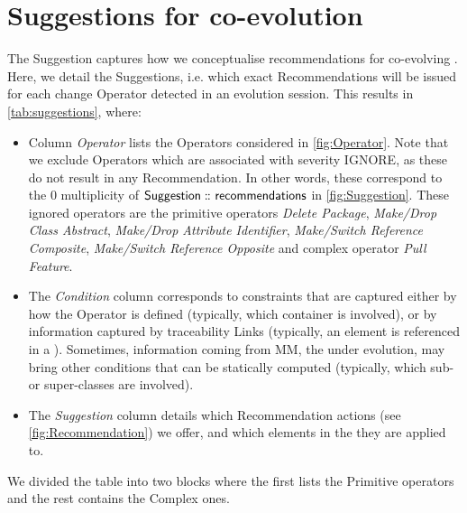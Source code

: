 \section{Suggestions for \viewtype co-evolution} 
\label{sec:Approach}

The \textsf{Suggestion} \metamodel captures how we
conceptualise recommendations for co-evolving \viewtypes. Here, we detail the \textsf{Suggestion}s, i.e. which exact \textsf{Recommendation}s
will be issued for each change \textsf{Operator} detected in an evolution
session. This results in \cref{tab:suggestions}, where:
\begin{itemize}
	\item Column \textsl{Operator} lists the \textsf{Operator}s considered in \cref{fig:Operator}. Note that we exclude \textsf{Operator}s which are
	associated with severity \textsf{IGNORE}, as 
	these do not result in any \textsf{Recommendation}. In other words, these correspond to the \textsf{0} multiplicity
	of $\mathsf{Suggestion} \,\colon\!\!\!\colon \mathsf{recommendations}$ in \cref{fig:Suggestion}. These ignored operators are the primitive 
 operators \textit{Delete Package}, 
	\textit{Make/Drop Class Abstract}, \textit{Make/Drop Attribute Identifier}, 
	\textit{Make/Switch Reference Composite}, \textit{Make/Switch Reference Opposite}
	and complex operator \textit{Pull Feature}. %
	
	\item The \textsl{Condition} column corresponds to constraints that are captured
	either by how the \textsf{Operator} is defined (typically, which \textsf{container}
	is involved), or by information captured by traceability \textsf{Link}s (typically,
	an element is referenced in a \viewtype). Sometimes, information coming from \textsf{MM},
	the \metamodel under evolution, may bring other conditions that can be statically
	computed (typically, which sub- or super-classes are involved).%
	
	\item The \textsl{Suggestion} column details which \textsf{Recommendation} actions (see \cref{fig:Recommendation}) we offer, and which elements in the \viewtype they are applied to.
\end{itemize}
We divided the table into two blocks where the first lists the \textsf{Primitive} operators and the rest contains the \textsf{Complex} ones.

